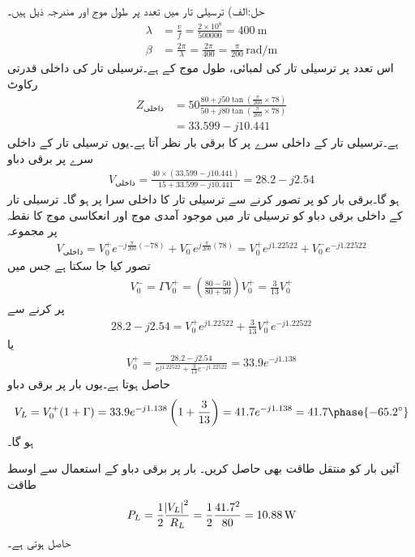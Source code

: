 حل:الف) ترسیلی تار میں  تعدد پر  طول موج اور  مندرجہ ذیل ہیں۔
\begin{align*}
\lambda&=\frac{v}{f}=\frac{2\times 10^8}{500000}=\SI{400}{\meter}\\
\beta&=\frac{2\pi}{\lambda}=\frac{2\pi}{400}=\frac{\pi}{200} \, \si{\radian\per\meter}
\end{align*}
اس تعدد پر ترسیلی تار کی لمبائی، طول موج  کے  ہے۔ترسیلی تار  کی داخلی قدرتی رکاوٹ
\begin{align*}
Z_{\text{داخلی}} &= 50 \frac{80+j 50 \tan (\frac{\pi}{200} \times 78)}{50+j 80 \tan (\frac{\pi}{200} \times 78)}\\
&=33.599-j 10.441
\end{align*}
ہے۔ترسیلی تار کے داخلی سرے پر  کا برقی بار  نظر آتا ہے۔یوں ترسیلی تار کے داخلی سرے پر برقی دباو
\begin{align*}
V_{\text{داخلی}}=\frac{40 \times (33.599-j 10.441)}{15+33.599-j 10.441}=28.2-j 2.54
\end{align*}
ہو گا۔برقی بار کو  پر تصور کرنے سے  ترسیلی تار  کا داخلی سرا  پر ہو گا۔ ترسیلی تار کے داخلی برقی دباو کو ترسیلی تار میں موجود آمدی موج  اور انعکاسی موج  کا نقطہ  پر مجموعہ
\begin{align*}
V_{\text{داخلی}} = V_0^+ e^{-j \frac{\pi}{200} (-78)}+V_0^- e^{j \frac{\pi}{200} (78)} = V_0^+ e^{j 1.22522}+V_0^- e^{-j 1.22522}
\end{align*}
 تصور کیا جا سکتا ہے جس میں
\begin{align*}
V_0^-=\Gamma V_0^+=\left(\frac{80-50}{80+50} \right) V_0^+=\frac{3}{13} V_0^+
\end{align*}
پر کرنے سے
\begin{align*}
28.2-j 2.54 = V_0^+ e^{j 1.22522}+\frac{3}{13} V_0^+ e^{-j 1.22522}
\end{align*}
یا
\begin{align*}
V_0^+=\frac{28.2-j 2.54}{e^{j 1.22522}+\frac{3}{13} e^{-j 1.22522}}=33.9 e^{-j 1.138}
\end{align*}
حاصل ہوتا ہے۔یوں بار پر برقی دباو
\begin{align*}
V_L=V_0^+(1+\Gamma) = 33.9 e^{-j 1.138} \left(1+\frac{3}{13}\right)=41.7 e^{-j 1.138}=41.7 \phase{-65.2^{\circ}}
\end{align*}
ہو گا۔

آئیں بار کو منتقل طاقت بھی حاصل کریں۔ بار پر برقی دباو  کے استعمال سے اوسط طاقت
\begin{align*}
P_L=\frac{1}{2} \frac{\abs{V_L}^2}{R_L}=\frac{1}{2} \frac{41.7^2}{80}=\SI{10.88}{\watt}
\end{align*}
حاصل ہوتی ہے۔

